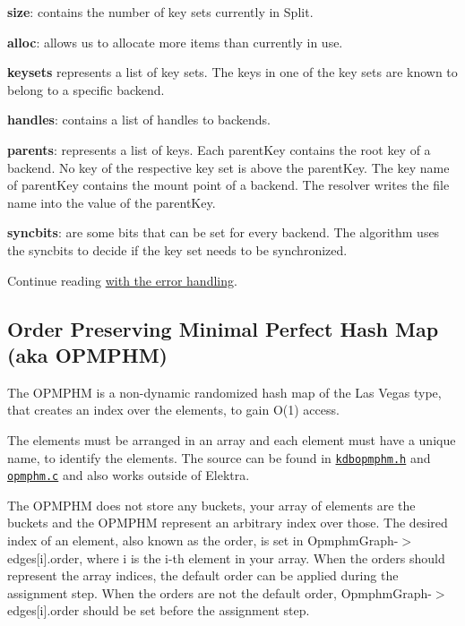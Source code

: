 \begin{DoxyItemize}
\item {\bfseries size}\+: contains the number of key sets currently in {\ttfamily Split}.
\item {\bfseries alloc}\+: allows us to allocate more items than currently in use.
\item {\bfseries keysets} represents a list of key sets. The keys in one of the key sets are known to belong to a specific backend.
\item {\bfseries handles}\+: contains a list of handles to backends.
\item {\bfseries parents}\+: represents a list of keys. Each {\ttfamily parent\+Key} contains the root key of a backend. No key of the respective key set is above the {\ttfamily parent\+Key}. The key name of {\ttfamily parent\+Key} contains the mount point of a backend. The resolver writes the file name into the value of the {\ttfamily parent\+Key}.
\item {\bfseries syncbits}\+: are some bits that can be set for every backend. The algorithm uses the {\ttfamily syncbits} to decide if the key set needs to be synchronized.
\end{DoxyItemize}

Continue reading \hyperlink{doc_dev_error-handling_md}{with the error handling}.

\subsection*{Order Preserving Minimal Perfect Hash Map (aka O\+P\+M\+P\+HM)}

The O\+P\+M\+P\+HM is a non-\/dynamic randomized hash map of the Las Vegas type, that creates an index over the elements, to gain O(1) access.

The elements must be arranged in an array and each element must have a unique name, to identify the elements. The source can be found in \href{/home/markus/Projekte/Elektra/current/src/include/kdbopmphm.h}{\tt kdbopmphm.\+h} and \href{/home/markus/Projekte/Elektra/current/src/libs/elektra/opmphm.c}{\tt opmphm.\+c} and also works outside of Elektra.

The O\+P\+M\+P\+HM does not store any buckets, your array of elements are the buckets and the O\+P\+M\+P\+HM represent an arbitrary index over those. The desired index of an element, also known as the order, is set in {\ttfamily Opmphm\+Graph-\/$>$edges\mbox{[}i\mbox{]}.order}, where {\ttfamily i} is the i-\/th element in your array. When the orders should represent the array indices, the default order can be applied during the assignment step. When the orders are not the default order, {\ttfamily Opmphm\+Graph-\/$>$edges\mbox{[}i\mbox{]}.order} should be set before the assignment step.

